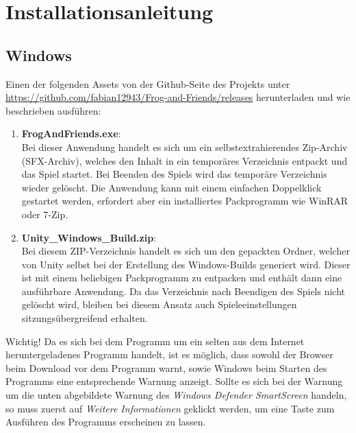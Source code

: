 \setlength{\parindent}{0em}

\chapter{Installationsanleitung}

\label{Chapter1}

\section{Windows}

Einen der folgenden Assets von der Github-Seite des Projekts unter \url{https://github.com/fabian12943/Frog-and-Friends/releases} herunterladen und wie beschrieben ausführen:
        \begin{enumerate}
            \item \textbf{FrogAndFriends.exe}:\\
            Bei dieser Anwendung handelt es sich um ein selbstextrahierendes Zip-Archiv (SFX-Archiv), welches den Inhalt in ein temporäres Verzeichnis entpackt und das Spiel startet. Bei Beenden des Spiels wird das temporäre Verzeichnis wieder gelöscht. Die Anwendung kann mit einem einfachen Doppelklick gestartet werden, erfordert aber ein installiertes Packprogramm wie WinRAR oder 7-Zip. 
            \item \textbf{Unity\_Windows\_Build.zip}:\\
            Bei diesem ZIP-Verzeichnis handelt es sich um den gepackten Ordner, welcher von Unity selbst bei der Erstellung des Windows-Builds generiert wird. Dieser ist mit einem beliebigen Packprogramm zu entpacken und enthält dann eine ausführbare Anwendung. Da das Verzeichnis nach Beendigen des Spiels nicht gelöscht wird, bleiben bei diesem Ansatz auch Spieleeinstellungen sitzungsübergreifend erhalten.
        \end{enumerate}

\begin{bclogo}[logo=\bcattention, noborder=true, barre=none]{Wichtig!}
    Da es sich bei dem Programm um ein selten aus dem Internet heruntergeladenes Programm handelt, ist es möglich, dass sowohl der Browser beim Download vor dem Programm warnt, sowie Windows beim Starten des Programms eine entsprechende Warnung anzeigt. Sollte es sich bei der Warnung um die unten abgebildete Warnung des \textit{Windows Defender SmartScreen} handeln, so muss zuerst auf \textit{Weitere Informationen} geklickt werden, um eine Taste zum Ausführen des Programms erscheinen zu lassen.
\end{bclogo}

